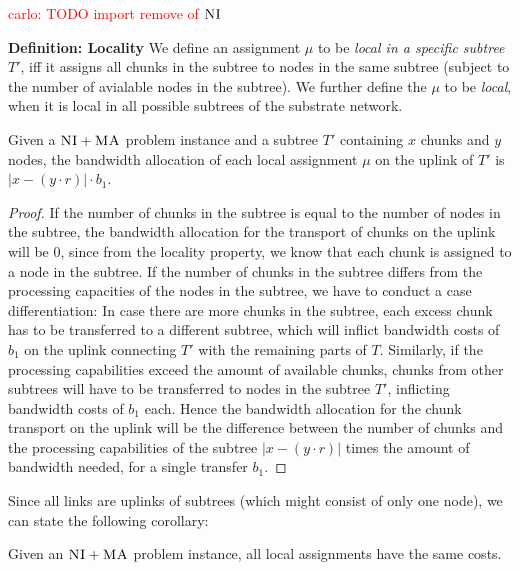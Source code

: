 \documentclass[9pt]{sigcomm-alternate}
\newcommand{\carlo}[1]{\textcolor{red}{carlo: #1}}
\newcommand{\MaFactor}{r}
\newcommand{\VmChunkAssignment}{\mu}
\newcommand{\CC}{\textsc{NI}}
\newcommand{\MA}{\textsc{MA}}
\newcommand{\Tree}{\ensuremath{T}}
\newcommand{\CostTrans}{\ensuremath{b_1}}
\begin{document}
\carlo{TODO import remove of $\CC$}

\textbf{Definition: Locality} We define an assignment $\VmChunkAssignment$ to 
be \emph{local in a specific subtree $T'$}, iff it assigns all chunks in the 
subtree to nodes in the same subtree (subject to the number of avialable nodes 
in the 
subtree). We further define the $\VmChunkAssignment$ to be \emph{local}, when 
it is local in all possible subtrees of the substrate network.


\begin{lemma}
Given a $\CC+\MA$ problem instance and a subtree $T'$ 
containing $x$
chunks and $y$ nodes, the bandwidth allocation of each local assignment
$\VmChunkAssignment$ on the uplink of $T'$ is $|x-(y\cdot\MaFactor)|\cdot
\CostTrans$.\label{lemma:uplink}
\end{lemma}

\begin{proof}
If the number of chunks in the subtree is equal to the number of nodes in the 
subtree, the bandwidth allocation for the transport of chunks on the uplink 
will be $0$, since from the locality property, we know that each chunk is 
assigned to a node in the subtree. If the
number of chunks in the subtree differs from the processing capacities of
the nodes in the subtree, we have to conduct a case differentiation: In case 
there are more chunks in the subtree, each
excess chunk has to be transferred to a different subtree, which will
inflict bandwidth costs of $\CostTrans$ on the uplink connecting $T'$ with the
remaining parts of $\Tree$. Similarly, if the processing capabilities exceed the 
amount of
available chunks, chunks from other subtrees will have to be transferred to
nodes in the subtree $T'$, inflicting bandwidth costs of $\CostTrans$ each. 
Hence the bandwidth allocation for the chunk transport on the uplink will be 
the difference between the number of chunks and the processing capabilities of 
the subtree $|x-(y\cdot\MaFactor)|$ times the amount of bandwidth needed, for a 
single transfer $\CostTrans$.
\end{proof}

Since all links are uplinks of subtrees (which might consist of only one node), 
we can state the following corollary:

\begin{corollary}
Given an $\CC+\MA$ problem instance, all local assignments have the same costs. 
\label{corollary:same_costs}
\end{corollary}
\end{document}
